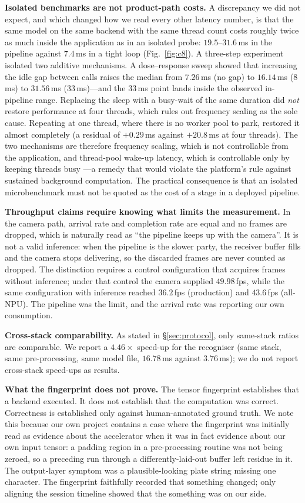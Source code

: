 \documentclass[conference]{IEEEtran}
\begin{document}
\textbf{Isolated benchmarks are not product-path costs.} A discrepancy we did
not expect, and which changed how we read every other latency number, is that
the same model on the same backend with the same thread count costs roughly
twice as much inside the application as in an isolated probe: $19.5$--$31.6$\,ms
in the pipeline against $7.4$\,ms in a tight loop (Fig.~\ref{fig:c8}). A three-step experiment
isolated two additive mechanisms. A dose--response sweep showed that increasing
the idle gap between calls raises the median from $7.26$\,ms (no gap) to
$16.14$\,ms ($8$\,ms) to $31.56$\,ms ($33$\,ms)---and the $33$\,ms point lands
inside the observed in-pipeline range. Replacing the sleep with a busy-wait of
the same duration did \emph{not} restore performance at four threads, which
rules out frequency scaling as the sole cause. Repeating at one thread, where
there is no worker pool to park, restored it almost completely (a residual of
$+0.29$\,ms against $+20.8$\,ms at four threads). The two mechanisms are
therefore frequency scaling, which is not controllable from the application, and
thread-pool wake-up latency, which is controllable only by keeping threads busy
---a remedy that would violate the platform's rule against sustained background
computation. The practical consequence is that an isolated microbenchmark must
not be quoted as the cost of a stage in a deployed pipeline.

\textbf{Throughput claims require knowing what limits the measurement.} In the
camera path, arrival rate and completion rate are equal and no frames are
dropped, which is naturally read as ``the pipeline keeps up with the camera''.
It is not a valid inference: when the pipeline is the slower party, the receiver
buffer fills and the camera stops delivering, so the discarded frames are never
counted as dropped. The distinction requires a control configuration that
acquires frames without inference; under that control the camera supplied
$49.98$\,fps, while the same configuration with inference reached $36.2$\,fps
(production) and $43.6$\,fps (all-NPU). The pipeline was the limit, and the
arrival rate was reporting our own consumption.

\textbf{Cross-stack comparability.} As stated in \S\ref{sec:protocol}, only
same-stack ratios are comparable. We report a $4.46\times$ speed-up for the
recogniser (same stack, same pre-processing, same model file, $16.78$\,ms
against $3.76$\,ms); we do not report cross-stack speed-ups as results.

\textbf{What the fingerprint does not prove.} The tensor fingerprint establishes
that a backend executed. It does not establish that the computation was correct.
Correctness is established only against human-annotated ground truth. We note
this because our own project contains a case where the fingerprint was initially
read as evidence about the accelerator when it was in fact evidence about our
own input tensor: a padding region in a pre-processing routine was not being
zeroed, so a preceding run through a differently-laid-out buffer left residue in
it. The output-layer symptom was a plausible-looking plate string missing one
character. The fingerprint faithfully recorded that something changed; only
aligning the session timeline showed that the something was on our side.
\end{document}
